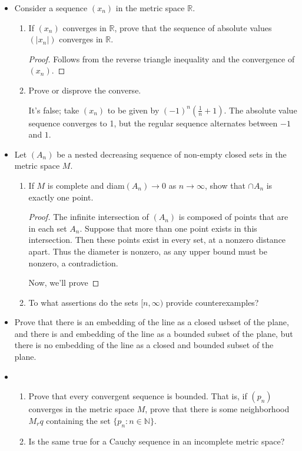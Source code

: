 \documentclass[11pt,a4paper]{article}
\newcommand{\pnum}[1]{\item[\textbf{#1}]}
\newcommand{\N}{\mathbb{N}}
\newcommand{\R}{\mathbb{R}}
\begin{document}
\begin{itemize}
	\pnum{2.26} Consider a sequence $(x_n)$ in the metric space $\R$.
	\begin{enumerate}[label=\alph*)]
		\item If $(x_n)$ converges in $\R$, prove that the sequence of absolute values $(|x_n|)$ converges
			in $\R$.
			\begin{proof}
				Follows from the reverse triangle inequality and the convergence of $(x_n)$.
			\end{proof}
		\item Prove or disprove the converse.

			It's false; take $(x_n)$ to be given by $(-1)^n \left( \frac{1}{n} + 1\right)$. The absolute 
			value sequence converges to 1, but the regular sequence alternates between $-1$ and $1$.
	\end{enumerate}

	\pnum{2.27} Let $(A_n)$ be a nested decreasing sequence of non-empty closed sets in the metric space
	$M$.
	\begin{enumerate}[label=\alph*)]
		\item If $M$ is complete and diam$(A_n) \to 0$ as $n \to \infty$, show that $\cap A_n$ is exactly
			one point.

			\begin{proof}
			The infinite intersection of $(A_n)$ is composed of points that are in each set $A_n$. Suppose
			that more than one point exists in this intersection. Then these points exist in every set, at
			a nonzero distance apart. Thus the diameter is nonzero, as any upper bound must be nonzero, a
			contradiction.

			Now, we'll prove 
			\end{proof}
		\item To what assertions do the sets $[n,\infty)$ provide counterexamples?
	\end{enumerate}

	\pnum{2.28} Prove that there is an embedding of the line as a closed usbset of the plane, and there is
	and embedding of the line as a bounded subset of the plane, but there is no embedding of the line as
	a closed and bounded subset of the plane.

	\pnum{2.29}
	\begin{enumerate}[label=\alph*)]
		\item Prove that every convergent sequence is bounded. That is, if $(p_n)$ converges in the metric
			space $M$, prove that there is some neighborhood $M_r q$ containing the set $\{p_n : n \in \N\}$.
		\item Is the same true for a Cauchy sequence in an incomplete metric space?
	\end{enumerate}


\end{itemize}
\end{document}
